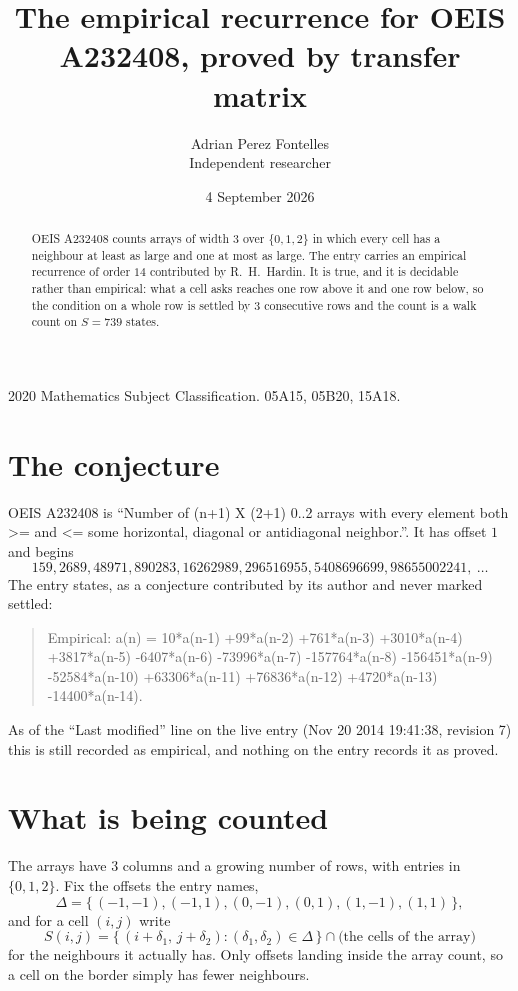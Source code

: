 \documentclass[11pt,a4paper]{article}
\title{The empirical recurrence for OEIS A232408, proved by transfer matrix}
\author{Adrian Perez Fontelles\\ \small Independent researcher}
\date{4 September 2026}
\theoremstyle{plain}
\theoremstyle{definition}
\begin{document}
\maketitle

\begin{abstract}
OEIS A232408 counts arrays of width $3$ over $\{0,1,2\}$ in which every cell has a neighbour at least as large and one at most as large. The entry carries an
empirical recurrence of order $14$ contributed by R.~H.~Hardin. It is true, and it is
decidable rather than empirical: what a cell asks reaches one row above it and one row below, so the
condition on a whole row is settled by $3$ consecutive rows and the count is a walk
count on $S=739$ states.
\end{abstract}

\noindent\small 2020 Mathematics Subject Classification. 05A15, 05B20, 15A18.\normalsize

\section{The conjecture}

OEIS A232408 is ``Number of (n+1) X (2+1) 0..2 arrays with every element both >= and <= some horizontal, diagonal or antidiagonal neighbor.''. It has offset $1$ and begins
\[
159, 2689, 48971, 890283, 16262989, 296516955, 5408696699, 98655002241,\ \dots
\]
The entry states, as a conjecture contributed by its author and never marked settled:
\begin{quote}
Empirical: a(n) = 10*a(n-1) +99*a(n-2) +761*a(n-3) +3010*a(n-4) +3817*a(n-5) -6407*a(n-6) -73996*a(n-7) -157764*a(n-8) -156451*a(n-9) -52584*a(n-10) +63306*a(n-11) +76836*a(n-12) +4720*a(n-13) -14400*a(n-14).
\end{quote}
As of the ``Last modified'' line on the live entry (Nov 20 2014 19:41:38, revision 7) this is still
recorded as empirical, and nothing on the entry records it as proved.

\section{What is being counted}

The arrays have $3$ columns and a growing number of rows, with entries in $\{0,1,2\}$. Fix the
offsets the entry names,
\[
\Delta=\{\,(-1,-1), (-1,1), (0,-1), (0,1), (1,-1), (1,1)\,\},
\]
and for a cell $(i,j)$ write
\[
S(i,j)=\{\,(i+\delta_1,\,j+\delta_2) : (\delta_1,\delta_2)\in\Delta\,\}\cap
\text{(the cells of the array)}
\]
for the neighbours it actually has. Only offsets landing inside the array count, so a cell on
the border simply has fewer neighbours.
\end{document}
